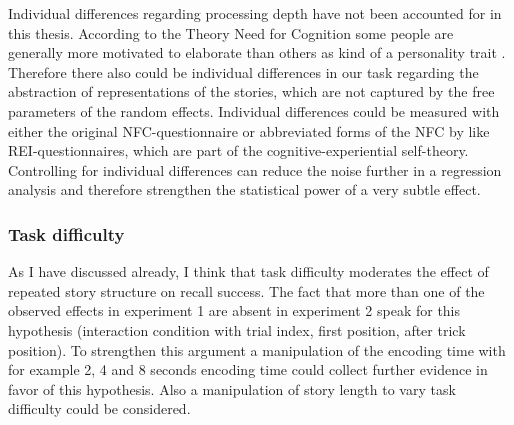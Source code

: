 \documentclass[a4paper,man,natbib,floatsintext,import]{apa6}
\begin{document}
Individual differences regarding processing depth have not been accounted for in this thesis. According to the Theory Need for Cognition some people are generally more motivated to elaborate than others as kind of a personality trait \citep{Cacioppo1982,Cacioppo1996}. Therefore there also could be individual differences in our task regarding the abstraction of representations of the stories, which are not captured by the free parameters of the random effects. Individual differences could be measured with either the original NFC-questionnaire \citep{Cacioppo1982} or abbreviated forms of the NFC by \cite{Epstein1996} like REI-questionnaires, which are part of the cognitive-experiential self-theory. Controlling for individual differences can reduce the noise further in a regression analysis and therefore strengthen the statistical power of a very subtle effect.

\subsubsection{Task difficulty}
As I have discussed already, I think that task difficulty moderates the effect of repeated story structure on recall success. The fact that more than one of the observed effects in experiment 1 are absent in experiment 2  speak for this hypothesis (interaction condition with trial index, first position, after trick position). To strengthen this argument a manipulation of the encoding time with for example 2, 4 and 8 seconds encoding time could collect further evidence in favor of this hypothesis. Also a manipulation of story length to vary task difficulty could be considered.




\end{document}
